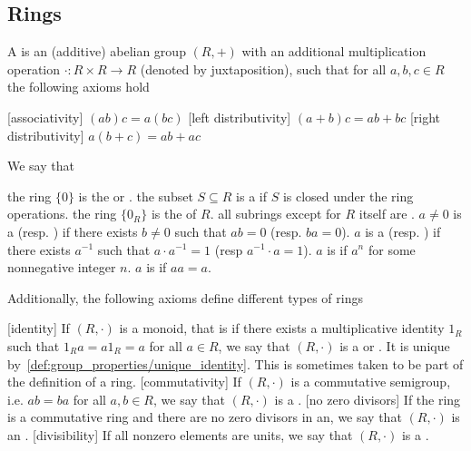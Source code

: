 \subsection{Rings}\label{subsec:rings}

\begin{definition}\label{def:ring}
  A  is an (additive) abelian group \( (R, +) \) with an additional multiplication operation \( \cdot: R \times R \to R \) (denoted by juxtaposition), such that for all \( a, b, c \in R \) the following axioms hold
  \begin{description}
    [associativity] \( (ab)c = a(bc) \)
    [left distributivity] \( (a + b)c = ab + bc \)
    [right distributivity] \( a(b + c) = ab + ac \)
  \end{description}

  We say that
  \begin{itemize}
     the ring \( \{ 0 \} \) is the  or .
     the subset \( S \subseteq R \) is a  if \( S \) is closed under the ring operations.
     the ring \( \{ 0_R \} \) is the  of \( R \).
     all subrings except for \( R \) itself are .
     \( a \neq 0 \) is a  (resp. ) if there exists \( b \neq 0 \) such that \( ab = 0 \) (resp. \( ba = 0 \)).
     \( a \) is a  (resp. ) if there exists \( a^{-1} \) such that \( a \cdot a^{-1} = 1 \) (resp \( a^{-1} \cdot a = 1 \)).
     \( a \) is  if \( a^n \) for some nonnegative integer \( n \).
     \( a \) is  if \( aa = a \).
  \end{itemize}

  Additionally, the following axioms define different types of rings
  \begin{description}
    [identity] If \( (R, \cdot) \) is a monoid, that is if there exists a multiplicative identity \( 1_R \) such that \( 1_R a = a1_R = a \) for all \( a \in R \), we say that \( (R, \cdot) \) is a  or . It is unique by~\cref{def:group_properties/unique_identity}. This is sometimes taken to be part of the definition of a ring.
    [commutativity] If \( (R, \cdot) \) is a commutative semigroup, i.e. \( ab = ba \) for all \( a, b \in R \), we say that \( (R, \cdot) \) is a .
    [no zero divisors] If the ring is a commutative ring and there are no zero divisors in an, we say that \( (R, \cdot) \) is an .
    [divisibility] If all nonzero elements are units, we say that \( (R, \cdot) \) is a .
  \end{description}


\end{definition}
